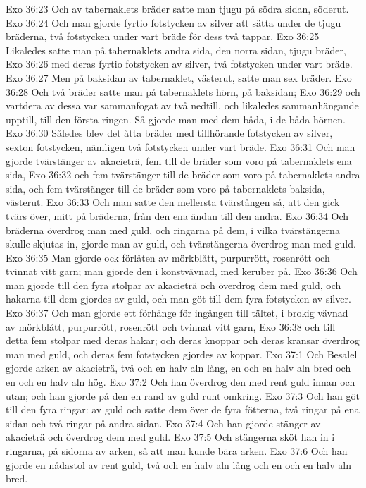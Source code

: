 Exo 36:23  Och av tabernaklets bräder satte man tjugu på södra sidan, söderut.
Exo 36:24  Och man gjorde fyrtio fotstycken av silver att sätta under de tjugu bräderna, två fotstycken under vart bräde för dess två tappar.
Exo 36:25  Likaledes satte man på tabernaklets andra sida, den norra sidan, tjugu bräder,
Exo 36:26  med deras fyrtio fotstycken av silver, två fotstycken under vart bräde.
Exo 36:27  Men på baksidan av tabernaklet, västerut, satte man sex bräder.
Exo 36:28  Och två bräder satte man på tabernaklets hörn, på baksidan;
Exo 36:29  och vartdera av dessa var sammanfogat av två nedtill, och likaledes sammanhängande upptill, till den första ringen. Så gjorde man med dem båda, i de båda hörnen.
Exo 36:30  Således blev det åtta bräder med tillhörande fotstycken av silver, sexton fotstycken, nämligen två fotstycken under vart bräde.
Exo 36:31  Och man gjorde tvärstänger av akacieträ, fem till de bräder som voro på tabernaklets ena sida,
Exo 36:32  och fem tvärstänger till de bräder som voro på tabernaklets andra sida, och fem tvärstänger till de bräder som voro på tabernaklets baksida, västerut.
Exo 36:33  Och man satte den mellersta tvärstången så, att den gick tvärs över, mitt på bräderna, från den ena ändan till den andra.
Exo 36:34  Och bräderna överdrog man med guld, och ringarna på dem, i vilka tvärstängerna skulle skjutas in, gjorde man av guld, och tvärstängerna överdrog man med guld.
Exo 36:35  Man gjorde ock förlåten av mörkblått, purpurrött, rosenrött och tvinnat vitt garn; man gjorde den i konstvävnad, med keruber på.
Exo 36:36  Och man gjorde till den fyra stolpar av akacieträ och överdrog dem med guld, och hakarna till dem gjordes av guld, och man göt till dem fyra fotstycken av silver.
Exo 36:37  Och man gjorde ett förhänge för ingången till tältet, i brokig vävnad av mörkblått, purpurrött, rosenrött och tvinnat vitt garn,
Exo 36:38  och till detta fem stolpar med deras hakar; och deras knoppar och deras kransar överdrog man med guld, och deras fem fotstycken gjordes av koppar.
Exo 37:1  Och Besalel gjorde arken av akacieträ, två och en halv aln lång, en och en halv aln bred och en och en halv aln hög.
Exo 37:2  Och han överdrog den med rent guld innan och utan; och han gjorde på den en rand av guld runt omkring.
Exo 37:3  Och han göt till den fyra ringar: av guld och satte dem över de fyra fötterna, två ringar på ena sidan och två ringar på andra sidan.
Exo 37:4  Och han gjorde stänger av akacieträ och överdrog dem med guld.
Exo 37:5  Och stängerna sköt han in i ringarna, på sidorna av arken, så att man kunde bära arken.
Exo 37:6  Och han gjorde en nådastol av rent guld, två och en halv aln lång och en och en halv aln bred.
